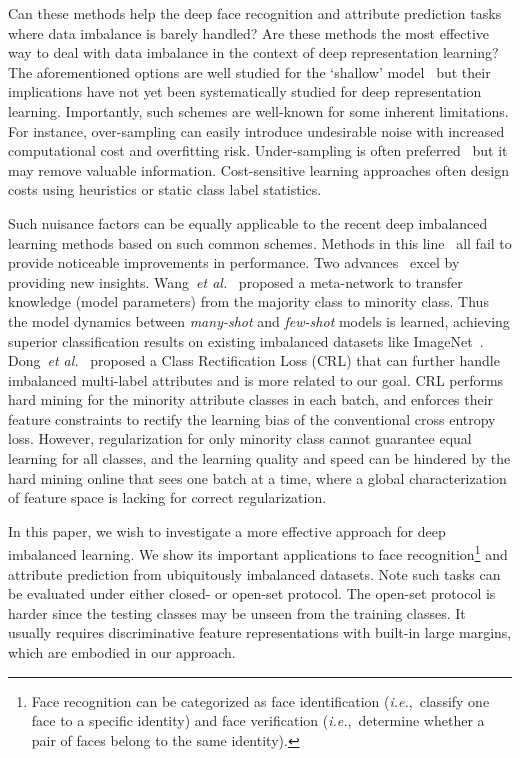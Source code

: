 \documentclass[10pt,journal,compsoc]{IEEEtran}
\newcommand{\etal}{\emph{et al.}}
\newcommand{\ie}{\emph{i.e.}}
\begin{document}
Can these methods help the deep face recognition and attribute prediction tasks where data imbalance is barely handled? Are these methods the most effective way to deal with data imbalance in the context of deep representation learning? The aforementioned options are well studied for the `shallow' model~\cite{Erhan10} but their implications have not yet been systematically studied for deep representation learning. Importantly, such schemes are well-known for some inherent limitations. For instance, over-sampling can easily introduce undesirable noise with increased computational cost and overfitting risk. Under-sampling is often preferred~\cite{Drummond03} but it may remove valuable information. Cost-sensitive learning approaches often design costs using heuristics or static class label statistics.

Such nuisance factors can be equally applicable to the recent deep imbalanced learning methods based on such common schemes. Methods in this line~\cite{Jeatrakul10,Khan18,Castro13,zhou2006training} all fail to provide noticeable improvements in performance. Two advances~\cite{NIPS2017_7278,Dong_2017_ICCV} excel by providing new insights. Wang~\etal~\cite{NIPS2017_7278} proposed a meta-network to transfer knowledge (model parameters) from the majority class to minority class. Thus the model dynamics between \textit{many-shot} and \textit{few-shot} models is learned, achieving superior classification results on existing imbalanced datasets like ImageNet~\cite{Russakovsky2015}. Dong~\etal~\cite{Dong_2017_ICCV} proposed a Class Rectification Loss (CRL) that can further handle imbalanced multi-label attributes and is more related to our goal. CRL performs hard mining for the minority attribute classes in each batch, and enforces their feature constraints to rectify the learning bias of the conventional cross entropy loss. However, regularization for only minority class cannot guarantee equal learning for all classes, and the learning quality and speed can be hindered by the hard mining online that sees one batch at a time, where a global characterization of feature space is lacking for correct regularization.

In this paper, we wish to investigate a more effective approach for deep imbalanced learning. We show its important applications to face recognition\footnote{Face recognition can be categorized as face identification (\ie,~classify one face to a specific identity) and face verification (\ie,~determine whether a pair of faces belong to the same identity).} and attribute prediction from ubiquitously imbalanced datasets. Note such tasks can be evaluated under either closed- or open-set protocol. The open-set protocol is harder since the testing classes may be unseen from the training classes. It usually requires discriminative feature representations with built-in large margins, which are embodied in our approach.
\end{document}
